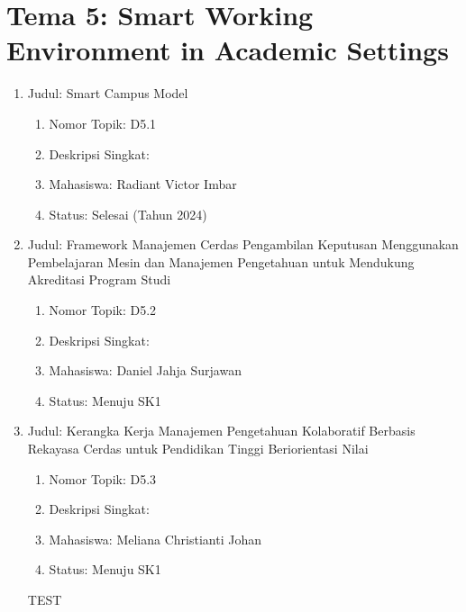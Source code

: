 \documentclass[
  letterpaper,
  DIV=11,
  numbers=noendperiod]{scrreprt}
\providecommand{\tightlist}{%
  \setlength{\itemsep}{0pt}\setlength{\parskip}{0pt}}
\begin{document}
\section{Tema 5: Smart Working Environment in Academic
Settings}\label{tema-5-smart-working-environment-in-academic-settings-3}

\begin{enumerate}
\def\labelenumi{\arabic{enumi}.}
\tightlist
\item
  Judul: Smart Campus Model

  \begin{enumerate}
  \def\labelenumii{\arabic{enumii}.}
  \tightlist
  \item
    Nomor Topik: D5.1
  \item
    Deskripsi Singkat:
  \item
    Mahasiswa: Radiant Victor Imbar
  \item
    Status: Selesai (Tahun 2024)
  \end{enumerate}
\item
  Judul: Framework Manajemen Cerdas Pengambilan Keputusan Menggunakan
  Pembelajaran Mesin dan Manajemen Pengetahuan untuk Mendukung
  Akreditasi Program Studi

  \begin{enumerate}
  \def\labelenumii{\arabic{enumii}.}
  \tightlist
  \item
    Nomor Topik: D5.2
  \item
    Deskripsi Singkat:
  \item
    Mahasiswa: Daniel Jahja Surjawan
  \item
    Status: Menuju SK1
  \end{enumerate}
\item
  Judul: Kerangka Kerja Manajemen Pengetahuan Kolaboratif Berbasis
  Rekayasa Cerdas untuk Pendidikan Tinggi Beriorientasi Nilai

  \begin{enumerate}
  \def\labelenumii{\arabic{enumii}.}
  \tightlist
  \item
    Nomor Topik: D5.3
  \item
    Deskripsi Singkat:
  \item
    Mahasiswa: Meliana Christianti Johan
  \item
    Status: Menuju SK1
  \end{enumerate}

  TEST
\end{enumerate}

\end{document}
